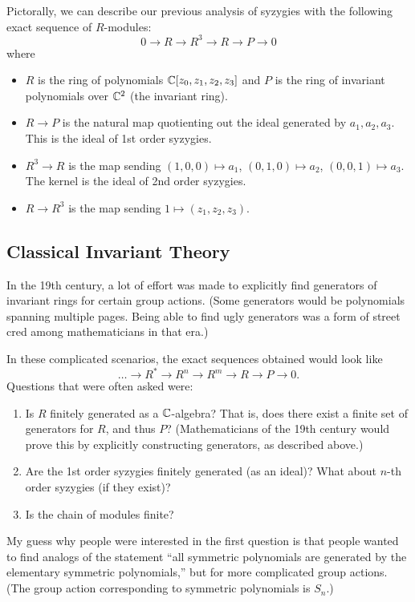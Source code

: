 Pictorally, we can describe our previous analysis of syzygies with the following exact sequence of $R$-modules:
\[
    0 \to R \to R^3 \to R \to P \to 0
\]
where
\begin{itemize}
    \item $R$ is the ring of polynomials ${\mathbb C}[z_0, z_1, z_2, z_3]$ and $P$ is the ring of invariant polynomials over ${\mathbb C}^2$ (the invariant ring).
    \item $R \to P$ is the natural map quotienting out the ideal generated by $a_1, a_2, a_3$. This is the ideal of 1st order syzygies.
    \item $R^3 \to R$ is the map sending $(1,0,0) \mapsto a_1$, $(0,1,0) \mapsto a_2$, $(0,0,1) \mapsto a_3$. The kernel is the ideal of 2nd order syzygies.
    \item $R \to R^3$ is the map sending $1 \mapsto (z_1, z_2, z_3)$.
\end{itemize}

\subsection{Classical Invariant Theory}
In the 19th century, a lot of effort was made to explicitly find generators of invariant rings for certain group actions. (Some generators would be polynomials spanning multiple pages. Being able to find ugly generators was a form of street cred among mathematicians in that era.)

In these complicated scenarios, the exact sequences obtained would look like
\[
    \dots \to R^* \to R^n \to R^m \to R \to P \to 0.
\]
Questions that were often asked were:
\begin{enumerate}
    \item Is $R$ finitely generated as a ${\mathbb C}$-algebra? That is, does there exist a finite set of generators for $R$, and thus $P$? (Mathematicians of the 19th century would prove this by explicitly constructing generators, as described above.)
    \item Are the 1st order syzygies finitely generated (as an ideal)? What about $n$-th order syzygies (if they exist)?
    \item Is the chain of modules finite?
\end{enumerate}
My guess why people were interested in the first question is that people wanted to find analogs of the statement ``all symmetric polynomials are generated by the elementary symmetric polynomials,'' but for more complicated group actions. (The group action corresponding to symmetric polynomials is $S_n$.)

